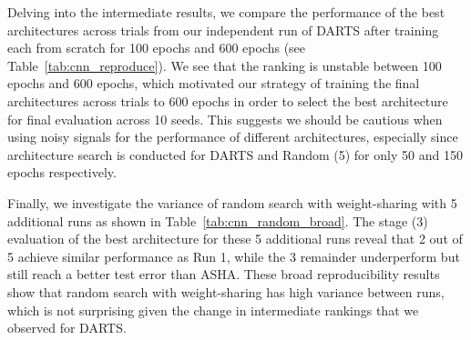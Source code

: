 \documentclass[acmlarge, nonacm]{acmart}
\begin{document}
\begin{table*}[h]
    \centering
     \caption{\textbf{CIFAR-10 Benchmark: Broad Reproducibility of Random Search WS}  We report the  stage 3 performance of the final architecture from 6 independent runs of random search with weight-sharing.  \\\hspace{\textwidth}
  This run was performed using the DARTS code before we corrected for non-determinism (see Appendix~\ref{ssec:appendix_reproduce}).  }
    \label{tab:cnn_random_broad}
   
\end{table*}
Delving into the intermediate results, we compare the performance of the best architectures across trials from our independent run of DARTS  after training each from scratch for 100 epochs and 600 epochs (see Table~\ref{tab:cnn_reproduce}).    We see that the ranking is unstable between 100 epochs and 600 epochs, which motivated our strategy of training the final architectures across trials to 600 epochs in order to select the best architecture for final evaluation across 10 seeds.  This suggests we should be cautious when using noisy signals for the performance of different architectures, especially since architecture search is conducted for DARTS and Random (5) for only 50 and 150 epochs respectively.

Finally, we investigate the variance of random search with weight-sharing with 5 additional runs as shown in  Table~\ref{tab:cnn_random_broad}.  The stage (3) evaluation of the best architecture for these 5 additional runs reveal that 2 out of 5 achieve similar performance as Run 1, while the 3 remainder underperform but still reach a better test error than ASHA.  These broad reproducibility results show that random search with weight-sharing has high variance between runs, which is not surprising given the change in intermediate rankings that we observed for DARTS.   
\end{document}
